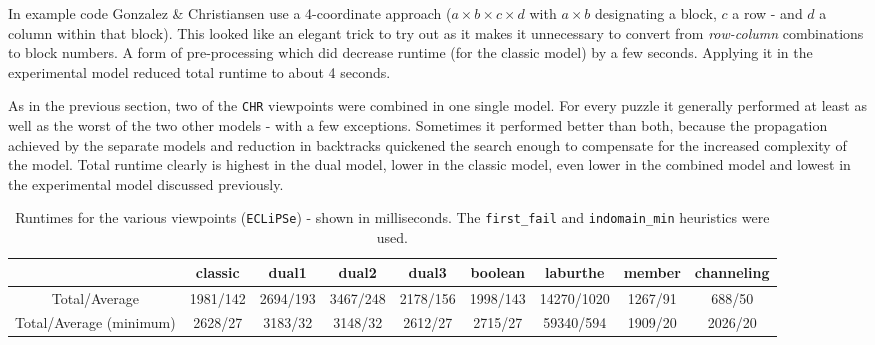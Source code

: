 In example code Gonzalez \& Christiansen use a 4-coordinate approach ($a\times b\times c\times d$ with $a\times b$ designating a block, $c$ a row - and $d$ a column within that block). This looked like an elegant trick to try out as it makes it unnecessary to convert from \textit{row-column} combinations to block numbers. A form of pre-processing which did decrease runtime (for the classic model) by a few seconds. Applying it in the experimental model reduced total runtime to about 4 seconds.\\\par

As in the previous section, two of the \texttt{CHR} viewpoints were combined in one single model. For every puzzle it generally performed at least as well as the worst of the two other models - with a few exceptions. Sometimes it performed better than both, because the propagation achieved by the separate models and reduction in backtracks quickened the search enough to compensate for the increased complexity of the model. Total runtime clearly is highest in the dual model, lower in the classic model, even lower in the combined model and lowest in the experimental model discussed previously.

\begin{table}[h]
\footnotesize
\bgroup
\def\arraystretch{1.3}
\begin{tabular}{ccccccccc}
\multicolumn{1}{l}{} & classic & dual1 & dual2 & dual3 & boolean & laburthe & member & channeling \\ \hline
Total/Average & 1981/142 & 2694/193 & 3467/248 & 2178/156 & 1998/143 & 14270/1020 & 1267/91 & 688/50 \\
Total/Average (minimum) & 2628/27 & 3183/32 & 3148/32 & 2612/27 & 2715/27 & 59340/594 & 1909/20 & 2026/20
\end{tabular}
\egroup
\caption{Runtimes for the various viewpoints (\texttt{ECLiPSe}) - shown in milliseconds. The \texttt{first\_fail} and \texttt{indomain\_min} heuristics were used.}
\label{tab:res1}
\end{table}

